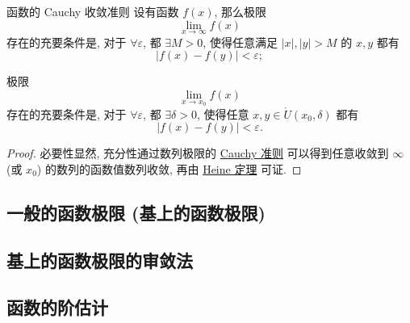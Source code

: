 \documentclass[cn,toc=twocol]{elegantbook}
\begin{document}
\vspace{0.6em}

\begin{theorem}{函数的 Cauchy 收敛准则}
	设有函数 $f(x)$, 那么极限
	\[
		\lim_{x \to \infty} f(x)
	\]
	存在的充要条件是, 对于 $\forall \varepsilon$, 都 $\exists M > 0$, 使得任意满足 $\lvert x\rvert,\lvert y\rvert > M$ 的 $x,y$ 都有
	\[
		\lvert f(x) - f(y) \rvert < \varepsilon;
	\]
	
	极限
	\[
		\lim_{x \to x_0} f(x)
	\]
	存在的充要条件是, 对于 $\forall \varepsilon$, 都 $\exists \delta > 0$, 使得任意 $x,y \in \mathring{U}(x_0,\delta)$ 都有
	\[
		\lvert f(x) - f(y) \rvert < \varepsilon.
	\]
\end{theorem}

\begin{proof}
	必要性显然, 充分性通过数列极限的 \hyperref[thm:R5]{Cauchy 准则} 可以得到任意收敛到 $\infty$ (或 $x_0$) 的数列的函数值数列收敛, 再由 \hyperref[thm:Heine]{Heine 定理} 可证.
\end{proof}


\subsection{一般的函数极限 (基上的函数极限)}

\subsection{基上的函数极限的审敛法}




\subsection{函数的阶估计}
\end{document}
